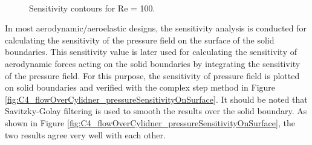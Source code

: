 \begin{figure}[H]
    \centering
    \quad
    \\
    \caption{Sensitivity contours for Re = 100.}
    \label{fig:C4_flowOverCylinderSensitivityContour}
\end{figure}

In most aerodynamic/aeroelastic designs, the sensitivity analysis is conducted for calculating the sensitivity of the pressure field on the surface of the solid boundaries. This sensitivity value is later used for calculating the sensitivity of aerodynamic forces acting on the solid boundaries by integrating the sensitivity of the pressure field. For this purpose, the sensitivity of pressure field is plotted on solid boundaries and verified with the complex step method in Figure \ref{fig:C4_flowOverCylidner_pressureSensitivityOnSurface}. It should be noted that Savitzky-Golay filtering is used to smooth the results over the solid boundary. As shown in Figure \ref{fig:C4_flowOverCylidner_pressureSensitivityOnSurface}, the two results agree very well with each other.

